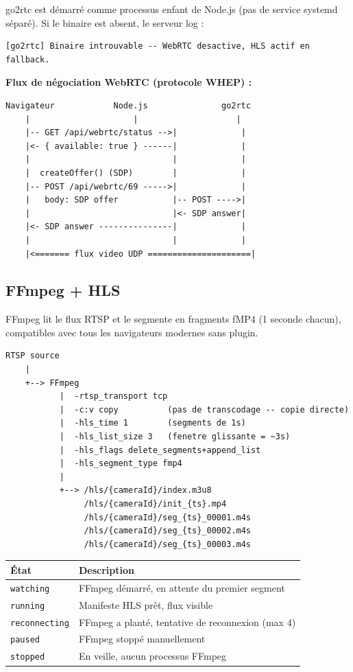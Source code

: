 \documentclass[12pt,a4paper]{article}
\begin{document}
go2rtc est démarré comme processus enfant de Node.js (pas de service systemd séparé).
Si le binaire est absent, le serveur log :
\begin{lstlisting}
[go2rtc] Binaire introuvable -- WebRTC desactive, HLS actif en fallback.
\end{lstlisting}

\textbf{Flux de négociation WebRTC (protocole WHEP) :}
\begin{lstlisting}
Navigateur            Node.js               go2rtc
    |                     |                    |
    |-- GET /api/webrtc/status -->|             |
    |<- { available: true } ------|             |
    |                             |             |
    |  createOffer() (SDP)        |             |
    |-- POST /api/webrtc/69 ----->|             |
    |   body: SDP offer           |-- POST ---->|
    |                             |<- SDP answer|
    |<- SDP answer ---------------|             |
    |                             |             |
    |<======= flux video UDP =====================|
\end{lstlisting}

\subsection{FFmpeg + HLS}

FFmpeg lit le flux RTSP et le segmente en fragments fMP4 (1 seconde chacun), compatibles
avec tous les navigateurs modernes sans plugin.

\begin{lstlisting}
RTSP source
    |
    +--> FFmpeg
           |  -rtsp_transport tcp
           |  -c:v copy          (pas de transcodage -- copie directe)
           |  -hls_time 1        (segments de 1s)
           |  -hls_list_size 3   (fenetre glissante = ~3s)
           |  -hls_flags delete_segments+append_list
           |  -hls_segment_type fmp4
           |
           +--> /hls/{cameraId}/index.m3u8
                /hls/{cameraId}/init_{ts}.mp4
                /hls/{cameraId}/seg_{ts}_00001.m4s
                /hls/{cameraId}/seg_{ts}_00002.m4s
                /hls/{cameraId}/seg_{ts}_00003.m4s
\end{lstlisting}

\begin{longtable}{|l|p{9cm}|}
\hline
\textbf{État} & \textbf{Description} \\
\hline
\endhead
\hline
\endfoot
\texttt{watching} & FFmpeg démarré, en attente du premier segment \\
\texttt{running} & Manifeste HLS prêt, flux visible \\
\texttt{reconnecting} & FFmpeg a planté, tentative de reconnexion (max 4) \\
\texttt{paused} & FFmpeg stoppé manuellement \\
\texttt{stopped} & En veille, aucun processus FFmpeg \\
\hline
\end{longtable}
\end{document}
